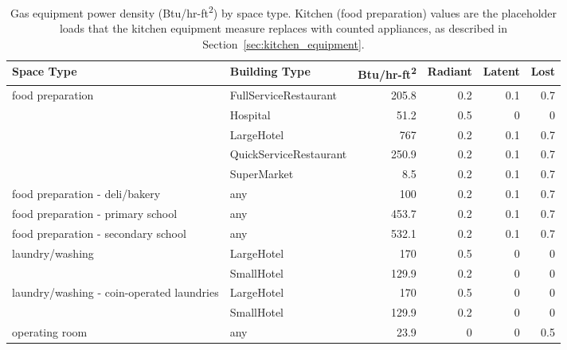 \begin{table}[h!]
\scriptsize
\centering
\caption[Gas Equipment Power Density]{Gas equipment power density (Btu/hr-ft\textsuperscript{2}) by space type. Kitchen (food preparation) values are the placeholder loads that the kitchen equipment measure replaces with counted appliances, as described in Section~\ref{sec:kitchen_equipment}.}
\label{tab:gas_equip}
\begin{tabular}{|p{2.2in}|p{1.3in}|r|r|r|r|}
\hline
\textbf{Space Type} & \textbf{Building Type} & \textbf{Btu/hr-ft\textsuperscript{2}} & \textbf{Radiant} & \textbf{Latent} & \textbf{Lost} \\ \hline
food preparation & FullServiceRestaurant & 205.8 & 0.2 & 0.1 & 0.7 \\ \hline
 & Hospital & 51.2 & 0.5 & 0 & 0 \\ \hline
 & LargeHotel & 767 & 0.2 & 0.1 & 0.7 \\ \hline
 & QuickServiceRestaurant & 250.9 & 0.2 & 0.1 & 0.7 \\ \hline
 & SuperMarket & 8.5 & 0.2 & 0.1 & 0.7 \\ \hline
food preparation - deli/bakery & any & 100 & 0.2 & 0.1 & 0.7 \\ \hline
food preparation - primary school & any & 453.7 & 0.2 & 0.1 & 0.7 \\ \hline
food preparation - secondary school & any & 532.1 & 0.2 & 0.1 & 0.7 \\ \hline
laundry/washing & LargeHotel & 170 & 0.5 & 0 & 0 \\ \hline
 & SmallHotel & 129.9 & 0.2 & 0 & 0 \\ \hline
laundry/washing - coin-operated laundries & LargeHotel & 170 & 0.5 & 0 & 0 \\ \hline
 & SmallHotel & 129.9 & 0.2 & 0 & 0 \\ \hline
operating room & any & 23.9 & 0 & 0 & 0.5 \\ \hline
\end{tabular}
\end{table}
